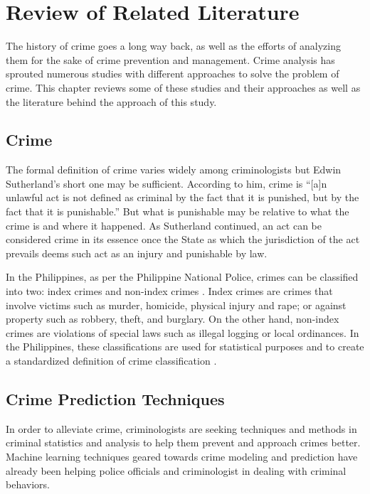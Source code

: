 \chapter{Review of Related Literature}
    The history of crime goes a long way back, as well as the efforts of analyzing them for the sake of crime prevention and management. Crime analysis has sprouted numerous studies with different approaches to solve the problem of crime. This chapter reviews some of these studies and their approaches as well as the literature behind the approach of this study.
\section{Crime}
    The formal definition of crime varies widely among criminologists but Edwin Sutherland’s short one may be sufficient. According to him, crime is “[a]n unlawful act is not defined as criminal by the fact that it is punished, but by the fact that it is punishable.” \citep{brown2010criminology} But what is punishable may be relative to what the crime is and where it happened. As Sutherland continued, an act can be considered crime in its essence once the State as which the jurisdiction of the act prevails deems such act as an injury and punishable by law.

    In the Philippines, as per the Philippine National Police, crimes can be classified into two: index crimes and non-index crimes \citep{senate2013criminal}. Index crimes are crimes that involve victims such as murder, homicide, physical injury and rape; or against property such as robbery, theft, and burglary. On the other hand, non-index crimes are violations of special laws such as illegal logging or local ordinances. In the Philippines, these classifications are used for statistical purposes and to create a standardized definition of crime classification \citep{tumulak2015crime}.

\section{Crime Prediction Techniques}
    In order to alleviate crime, criminologists are seeking techniques and methods in criminal statistics and analysis to help them prevent and approach crimes better. Machine learning techniques geared towards crime modeling and prediction have already been helping police officials and criminologist in dealing with criminal behaviors.


